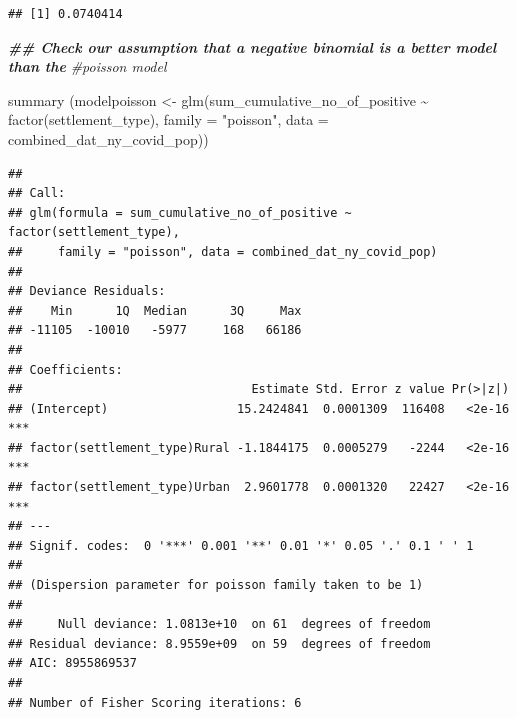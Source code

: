 \documentclass[
  12pt,
]{article}
\newenvironment{Shaded}{\begin{snugshade}}{\end{snugshade}}
\newcommand{\AttributeTok}[1]{\textcolor[rgb]{0.77,0.63,0.00}{#1}}
\newcommand{\CommentTok}[1]{\textcolor[rgb]{0.56,0.35,0.01}{\textit{#1}}}
\newcommand{\ConstantTok}[1]{\textcolor[rgb]{0.00,0.00,0.00}{#1}}
\newcommand{\DocumentationTok}[1]{\textcolor[rgb]{0.56,0.35,0.01}{\textbf{\textit{#1}}}}
\newcommand{\FunctionTok}[1]{\textcolor[rgb]{0.00,0.00,0.00}{#1}}
\newcommand{\NormalTok}[1]{#1}
\newcommand{\OtherTok}[1]{\textcolor[rgb]{0.56,0.35,0.01}{#1}}
\newcommand{\SpecialCharTok}[1]{\textcolor[rgb]{0.00,0.00,0.00}{#1}}
\newcommand{\StringTok}[1]{\textcolor[rgb]{0.31,0.60,0.02}{#1}}
\begin{document}
\begin{Shaded}
\end{Shaded}

\begin{verbatim}
## [1] 0.0740414
\end{verbatim}

\begin{Shaded}
\begin{Highlighting}[]
\DocumentationTok{\#\# Check our assumption that a negative binomial is a better model than the}
\CommentTok{\#poisson model}

\FunctionTok{summary}\NormalTok{ (modelpoisson }\OtherTok{\textless{}{-}}
           \FunctionTok{glm}\NormalTok{(sum\_cumulative\_no\_of\_positive }\SpecialCharTok{\textasciitilde{}} \FunctionTok{factor}\NormalTok{(settlement\_type),}
               \AttributeTok{family =} \StringTok{"poisson"}\NormalTok{, }\AttributeTok{data =}\NormalTok{ combined\_dat\_ny\_covid\_pop))}
\end{Highlighting}
\end{Shaded}

\begin{verbatim}
## 
## Call:
## glm(formula = sum_cumulative_no_of_positive ~ factor(settlement_type), 
##     family = "poisson", data = combined_dat_ny_covid_pop)
## 
## Deviance Residuals: 
##    Min      1Q  Median      3Q     Max  
## -11105  -10010   -5977     168   66186  
## 
## Coefficients:
##                                Estimate Std. Error z value Pr(>|z|)    
## (Intercept)                  15.2424841  0.0001309  116408   <2e-16 ***
## factor(settlement_type)Rural -1.1844175  0.0005279   -2244   <2e-16 ***
## factor(settlement_type)Urban  2.9601778  0.0001320   22427   <2e-16 ***
## ---
## Signif. codes:  0 '***' 0.001 '**' 0.01 '*' 0.05 '.' 0.1 ' ' 1
## 
## (Dispersion parameter for poisson family taken to be 1)
## 
##     Null deviance: 1.0813e+10  on 61  degrees of freedom
## Residual deviance: 8.9559e+09  on 59  degrees of freedom
## AIC: 8955869537
## 
## Number of Fisher Scoring iterations: 6
\end{verbatim}
\end{document}
